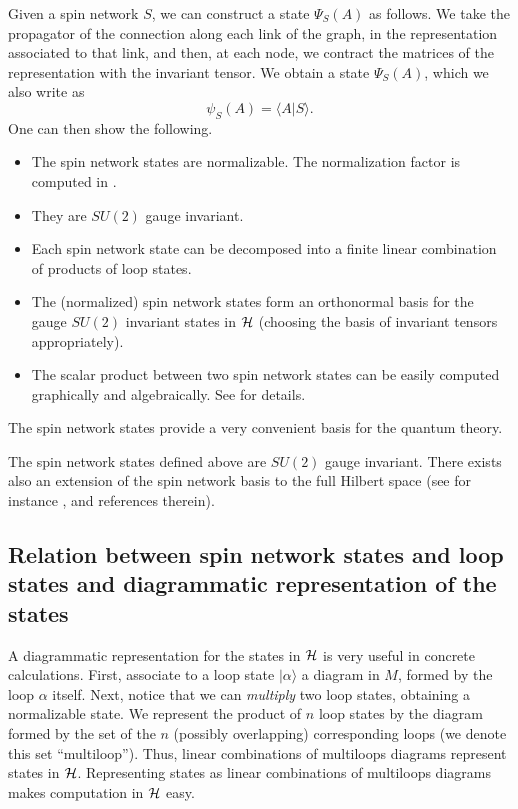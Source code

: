 Given a spin network $S$, we can construct a state $\Psi_{S}(A)$ 
as follows.  We take the propagator of the connection along each 
link of the graph, in the representation associated to that link, 
and then, at each node, we contract the matrices of the 
representation with the invariant tensor.  We obtain a state 
$\Psi_{S}(A)$, which we also write as
\begin{equation}
	\psi_{S}(A) = \langle A |S \rangle . 
\end{equation}
One can then show the following. 
\begin{itemize}
 \item The spin network states are normalizable.  The 
 normalization factor is computed in \cite{DePietriRovelli}.  
 \item They are $SU(2)$ gauge invariant.  
 \item Each spin network state can be decomposed into a finite 
 linear combination of products of loop states.
 \item The (normalized) spin network states form an orthonormal 
 basis for the gauge $SU(2)$ invariant states in $\cal H$ 
 (choosing the basis of invariant tensors appropriately).
 \item The scalar product between two spin network states can be 
 easily computed graphically and algebraically.  See 
 \cite{DePietriRovelli} for details.
\end{itemize}
The spin network states provide a very convenient basis for the 
quantum theory.  

The spin network states defined above are $SU(2)$ gauge 
invariant.  There exists also an extension of the spin network 
basis to the full Hilbert space (see for instance 
\cite{AshtekarLewandowskiArea2,BorissovEtAl97}, and references 
therein).

\subsection{Relation between spin network states and loop 
states and diagrammatic representation of the states}

A diagrammatic representation for the states in $\cal H$ is very 
useful in concrete calculations. 
First, associate to a loop state $|\alpha\rangle$ a diagram 
in $M$, formed by the loop $\alpha$ itself.  Next, notice that we 
can {\em multiply\/} two loop states, obtaining a normalizable 
state.  We represent the product of $n$ loop states by the 
diagram formed by the set of the $n$ (possibly overlapping) 
corresponding loops (we denote this set ``multiloop'').  Thus, 
linear combinations of multiloops diagrams represent states in 
$\cal H$.  Representing states as linear combinations of 
multiloops diagrams makes computation in $\cal H$  
easy.

